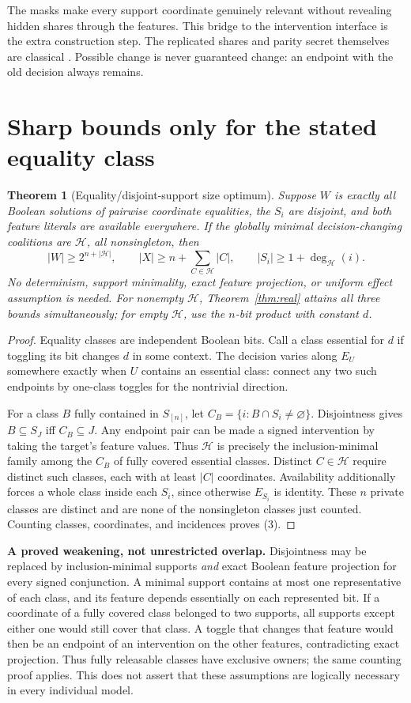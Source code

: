 \documentclass[11pt]{article}
\newtheorem{theorem}{Theorem}
\newcommand{\Hh}{\mathcal H}
\begin{document}
The masks make every support coordinate genuinely relevant without revealing hidden shares through the features. This bridge to the intervention interface is the extra construction step. The replicated shares and parity secret themselves are classical \cite{isn,bl}. Possible change is never guaranteed change: an endpoint with the old decision always remains.

\section{Sharp bounds only for the stated equality class}
\begin{theorem}[Equality/disjoint-support size optimum]\label{thm:size}
Suppose $W$ is \emph{exactly all} Boolean solutions of pairwise coordinate equalities, the $S_i$ are disjoint, and both feature literals are available everywhere. If the globally minimal decision-changing coalitions are $\Hh$, all nonsingleton, then
\[
 |W|\ge2^{n+|\Hh|},\qquad |X|\ge n+\sum_{C\in\Hh}|C|,\qquad
 |S_i|\ge1+\deg_{\Hh}(i). \tag{3}
\]
No determinism, support minimality, exact feature projection, or uniform effect assumption is needed. For nonempty $\Hh$, Theorem~\ref{thm:real} attains all three bounds simultaneously; for empty $\Hh$, use the $n$-bit product with constant $d$.
\end{theorem}
\begin{proof}
Equality classes are independent Boolean bits. Call a class essential for $d$ if toggling its bit changes $d$ in some context. The decision varies along $E_U$ somewhere exactly when $U$ contains an essential class: connect any two such endpoints by one-class toggles for the nontrivial direction.

For a class $B$ fully contained in $S_{[n]}$, let $C_B=\{i:B\cap S_i\ne\varnothing\}$. Disjointness gives $B\subseteq S_J$ iff $C_B\subseteq J$. Any endpoint pair can be made a signed intervention by taking the target's feature values. Thus $\Hh$ is precisely the inclusion-minimal family among the $C_B$ of fully covered essential classes. Distinct $C\in\Hh$ require distinct such classes, each with at least $|C|$ coordinates. Availability additionally forces a whole class inside each $S_i$, since otherwise $E_{S_i}$ is identity. These $n$ private classes are distinct and are none of the nonsingleton classes just counted. Counting classes, coordinates, and incidences proves (3).
\end{proof}
\noindent\textbf{A proved weakening, not unrestricted overlap.}
Disjointness may be replaced by inclusion-minimal supports \emph{and} exact Boolean feature projection for every signed conjunction. A minimal support contains at most one representative of each class, and its feature depends essentially on each represented bit. If a coordinate of a fully covered class belonged to two supports, all supports except either one would still cover that class. A toggle that changes that feature would then be an endpoint of an intervention on the other features, contradicting exact projection. Thus fully releasable classes have exclusive owners; the same counting proof applies. This does not assert that these assumptions are logically necessary in every individual model.
\end{document}
